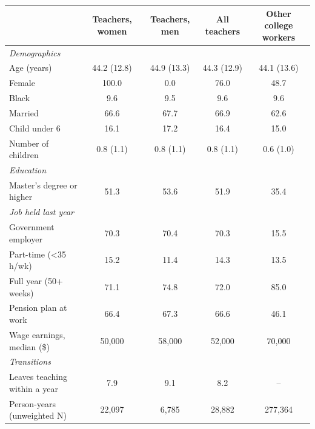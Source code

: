 \begin{tabular}{lcccc}
\toprule
 & Teachers, women & Teachers, men & All teachers & Other college workers \\
\midrule
\multicolumn{5}{l}{\emph{Demographics}} \\
Age (years) & 44.2 (12.8) & 44.9 (13.3) & 44.3 (12.9) & 44.1 (13.6) \\
Female & 100.0 & 0.0 & 76.0 & 48.7 \\
Black & 9.6 & 9.5 & 9.6 & 9.6 \\
Married & 66.6 & 67.7 & 66.9 & 62.6 \\
Child under 6 & 16.1 & 17.2 & 16.4 & 15.0 \\
Number of children & 0.8 (1.1) & 0.8 (1.1) & 0.8 (1.1) & 0.6 (1.0) \\
\multicolumn{5}{l}{\emph{Education}} \\
Master's degree or higher & 51.3 & 53.6 & 51.9 & 35.4 \\
\multicolumn{5}{l}{\emph{Job held last year}} \\
Government employer & 70.3 & 70.4 & 70.3 & 15.5 \\
Part-time (<35 h/wk) & 15.2 & 11.4 & 14.3 & 13.5 \\
Full year (50+ weeks) & 71.1 & 74.8 & 72.0 & 85.0 \\
Pension plan at work & 66.4 & 67.3 & 66.6 & 46.1 \\
Wage earnings, median (\$) & 50,000 & 58,000 & 52,000 & 70,000 \\
\multicolumn{5}{l}{\emph{Transitions}} \\
Leaves teaching within a year & 7.9 & 9.1 & 8.2 & -- \\
Person-years (unweighted N) & 22,097 & 6,785 & 28,882 & 277,364 \\
\bottomrule
\end{tabular}

